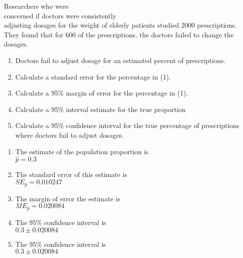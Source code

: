 \documentclass[11pt]{book}\usepackage[]{graphicx}\usepackage[]{color}
\begin{document}
\begin{exercises}
%

  \begin{exercise} %



Researchers who were \\ concerned if doctors were consistently \\ adjusting dosages for the weight of elderly patients studied 2000 prescriptions.  \\ They found that for 600 of the  prescriptions, the doctors failed to change the  dosages.

\begin{enumerate}
\item	Doctors fail to adjust dosage for an estimated \underline{\phantom{xxxxxxxx}}  percent of prescriptions.
\item	Calculate a standard error for the percentage in (1).
\item	Calculate a 95\% margin of error for the percentage in (1).
\item	Calculate a 95\% interval estimate for the true proportion
\item	Calculate a 95\% confidence interval for the true percentage of prescriptions  \\ where doctors fail to adjust dosages.
\end{enumerate}
  \end{exercise}
  \begin{solution} %

\begin{enumerate}
\item	The estimate of the population proportion is \\ $\hat{p} = 0.3$
\item	The standard error of this estimate is \\ $SE_{\hat{p}} = 0.010247$
\item The margin of error the estimate is \\ $ME_{\hat{p}} = 0.020084$
\item	The 95\% confidence interval is \\ $0.3 \pm 0.020084$
\item	The 95\% confidence interval is \\ $0.3 \pm 0.020084$
\end{enumerate}
  \end{solution}


\end{exercises}
\end{document}
